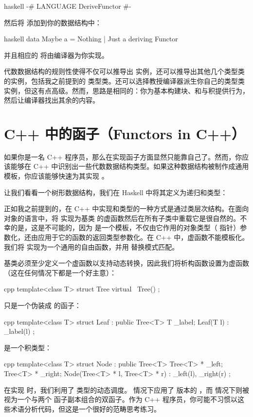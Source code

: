 \begin{snip}{haskell}
{-# LANGUAGE DeriveFunctor #-}
\end{snip}
然后将  添加到你的数据结构中：

\begin{snip}{haskell}
  data Maybe a = Nothing | Just a deriving Functor
\end{snip}
并且相应的  将由编译器为你实现。

代数数据结构的规则性使得不仅可以推导出  实例，还可以推导出其他几个类型类的实例，包括我之前提到的  类型类。还可以选择教授编译器派生你自己的类型类实例，但这有点高级。然而，思路是相同的：你为基本构建块、和与积提供行为，然后让编译器找出其余的内容。

\section{C++ 中的函子（Functors in C++）}

如果你是一名 C++ 程序员，那么在实现函子方面显然只能靠自己了。然而，你应该能够在 C++ 中识别出一些代数数据结构类型。如果这种数据结构被制作成通用模板，你应该能够快速为其实现 。

让我们看看一个树形数据结构，我们在 Haskell 中将其定义为递归和类型：

正如我之前提到的，在 C++ 中实现和类型的一种方式是通过类层次结构。在面向对象的语言中，将  实现为基类  的虚函数然后在所有子类中重载它是很自然的。不幸的是，这是不可能的，因为  是一个模板，不仅由它作用的对象类型（ 指针）参数化，还由应用于它的函数的返回类型参数化。在 C++ 中，虚函数不能模板化。我们将  实现为一个通用的自由函数，并用  替换模式匹配。

基类必须至少定义一个虚函数以支持动态转换，因此我们将析构函数设置为虚函数（这在任何情况下都是一个好主意）：

\begin{snip}{cpp}
  template<class T>
  struct Tree {
    virtual ~Tree() {}
  };
\end{snip}
 只是一个伪装成  的函子：

\begin{snip}{cpp}
  template<class T>
  struct Leaf : public Tree<T> {
    T _label;
    Leaf(T l) : _label(l) {}
  };
\end{snip}
 是一个积类型：

\begin{snip}{cpp}
  template<class T>
  struct Node : public Tree<T> {
    Tree<T> * _left;
    Tree<T> * _right;
    Node(Tree<T> * l, Tree<T> * r) : _left(l), _right(r) {}
  };
\end{snip}
在实现  时，我们利用了  类型的动态调度。  情况下应用了  版本的 ，而  情况下则被视为一个与两个  函子副本组合的双函子。作为 C++ 程序员，你可能不习惯以这些术语分析代码，但这是一个很好的范畴思考练习。

